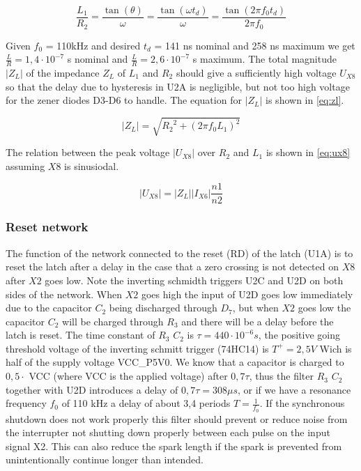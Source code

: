 \begin{equation} \label{eq:lr}
    \frac{L_1}{R_2} = \frac{\tan(\theta)}{\omega} = \frac{\tan(\omega t_{d})}{\omega} = \frac{\tan(2 \pi f_0 t_{d})}{2 \pi f_0}
\end{equation}

Given $f_0$ = 110kHz and desired $t_d$ = 141 ns nominal and 258 ns maximum we get $\frac{L}{R} = 1,4 \cdot 10^{-7}$ s nominal and $\frac{L}{R} = 2,6 \cdot 10^{-7}$ s maximum. The total magnitude $|Z_L|$ of the impedance $Z_{L}$ of $L_1$ and $R_2$ should give a sufficiently high voltage $U_{X8}$ so that the delay due to hysteresis in U2A is negligible, but not too high voltage for the zener diodes D3-D6 to handle. The equation for $|Z_L|$ is shown in \cref{eq:zl}.

\begin{equation} \label{eq:zl}
    |Z_{L}| = \sqrt{{R_2}^2 + (2 \pi f_0 L_1)^2}
\end{equation}

The relation between the peak voltage $|U_{X8}|$ over $R_2$ and $L_1$ is shown in \cref{eq:ux8} assuming $X8$ is sinusiodal.

\begin{equation} \label{eq:ux8}
    |U_{X8}| = |Z_L| |I_{X6}| \frac{n1}{n2}
\end{equation}


\subsubsection{Reset network}
\label{sec:reset_net}
The function of the network connected to the reset (RD) of the latch (U1A) is to reset the latch after a delay in the case that a zero crossing is not detected on $X8$ after $X2$ goes low. Note the inverting schmidth triggers U2C and U2D on both sides of the network. When $X2$ goes high the input of U2D goes low immediately due to the capacitor $C_2$ being discharged through $D_7$, but when $X2$ goes low the capacitor $C_2$ will be charged through $R_3$ and there will be a delay before the latch is reset. The time constant of $R_3$ $C_2$ is $\tau = 440 \cdot 10^{-6} s$, the positive going threshold voltage of the inverting schmitt trigger (74HC14) is $T^+ = 2,5V$ Wich is half of the supply voltage VCC\_P5V0. We know that a capacitor is charged to $0,5 \cdot$ VCC (where VCC is the applied voltage) after $0,7 \tau$, thus the filter $R_3$ $C_2$ together with U2D introduces a delay of $0,7 \tau = 308\mu s$, or if we have a resonance frequency $f_0$ of 110 kHz a delay of about 3,4 periods $T = \frac{1}{f_0}$. If the synchronous shutdown does not work properly this filter should prevent or reduce noise from the interrupter not shutting down properly between each pulse on the input signal X2. This can also reduce the spark length if the spark is prevented from unintentionally continue longer than intended.

